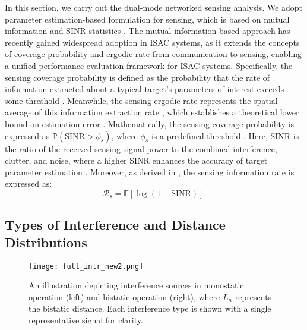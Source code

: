 \documentclass[journal]{IEEEtran}
\begin{document}
In this section, we carry out the dual-mode networked sensing analysis. We adopt parameter estimation-based formulation for sensing, which is based on mutual information and SINR statistics \cite{olson2023coverage,meng2024network}.
The mutual-information-based approach has recently gained widespread adoption in ISAC systems, as it extends the concepts of coverage probability and ergodic rate from communication to sensing, enabling a unified performance evaluation framework for ISAC systems. 
Specifically, the sensing coverage probability is defined as the probability that the rate of information extracted about a typical target's parameters of interest exceeds some threshold \cite{olson2023coverage}.  Meanwhile, the sensing ergodic rate represents the spatial average of this information extraction rate \cite{olson2023coverage}, which establishes a theoretical lower bound on estimation error \cite{liu2023deterministic}.  Mathematically, the sensing coverage probability is expressed as \( \mathbb{P} \left( \text{SINR} > \phi_s \right) \), where $\phi_s$ is a predefined threshold \cite{olson2023coverage}. Here, SINR  is the ratio of the received sensing signal power to the combined interference, clutter, and noise, where a higher SINR enhances the accuracy of target parameter estimation \cite{tang2018spectrally}. 
Moreover,
as derived in \cite{olson2023coverage,meng2024network}, the sensing information rate is expressed as:
\begin{equation}
\mathcal{R}_s = \mathbb{E}[\log(1 + \text{SINR})].   
\end{equation}












\subsection{Types of Interference and Distance Distributions}



\begin{figure*}[h]
\centering
  \texttt{[image: full\_intr\_new2.png]}
    \caption{An illustration depicting interference sources in monostatic operation (left) and bistatic operation (right),  where \( L_n \) represents the bistatic distance. Each interference type is shown with a single representative signal for clarity.}
    \label{ill_ntr}
\end{figure*}
\end{document}
